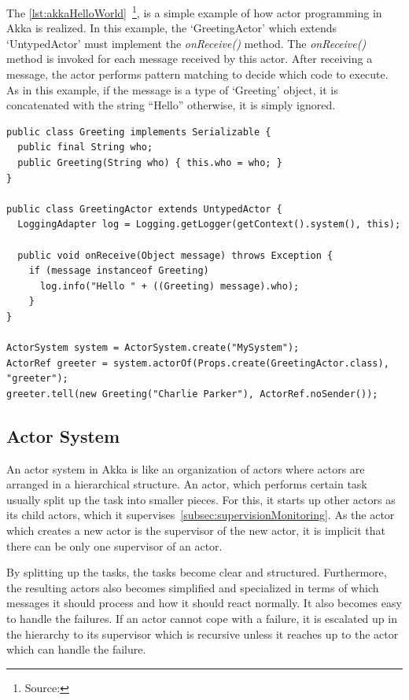   The \autoref{lst:akkaHelloWorld}~\footnote{Source: }, is a simple example of how actor programming in Akka is realized. In this example, the ‘GreetingActor’ which extends ‘UntypedActor’ must implement the \emph{onReceive()} method. The \emph{onReceive()} method is invoked for each message received by this actor. After receiving a message, the actor performs pattern matching to decide which code to execute. As in this example, if the message is a type of ‘Greeting’ object, it is concatenated with the string “Hello” otherwise, it is simply ignored.

\begin{lstlisting}[caption=A simple example of actor programming in akka~\cite{akkaHome}, label=lst:akkaHelloWorld]
public class Greeting implements Serializable {
  public final String who;
  public Greeting(String who) { this.who = who; }
}

public class GreetingActor extends UntypedActor {
  LoggingAdapter log = Logging.getLogger(getContext().system(), this);

  public void onReceive(Object message) throws Exception {
    if (message instanceof Greeting)
      log.info("Hello " + ((Greeting) message).who);
    }
}

ActorSystem system = ActorSystem.create("MySystem");
ActorRef greeter = system.actorOf(Props.create(GreetingActor.class), "greeter");
greeter.tell(new Greeting("Charlie Parker"), ActorRef.noSender());
\end{lstlisting}


  \subsection{Actor System}
  \label{subsec:actorSystem}
      An actor system in Akka is like an organization of actors where actors are arranged in a hierarchical structure. An actor, which performs certain task usually split up the task into smaller pieces. For this, it starts up other actors as its child actors, which it supervises~\autoref{subsec:supervisionMonitoring}. As the actor which creates a new actor is the supervisor of the new actor, it is implicit that there can be only one supervisor of an actor.

  By splitting up the tasks, the tasks become clear and structured. Furthermore, the resulting actors also becomes simplified and specialized in terms of which messages it should process and how it should react normally. It also becomes easy to handle the failures. If an actor cannot cope with a failure, it is escalated up in the hierarchy to its supervisor which is recursive unless it reaches up to the actor which can handle the failure.~\cite{akkaJavaDoc}

